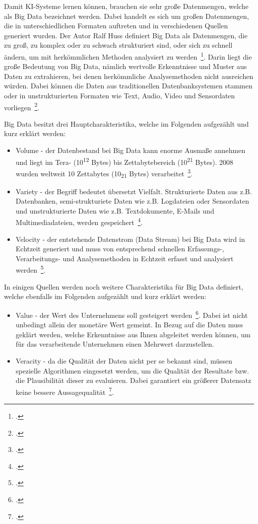 Damit {KI}-Systeme lernen können, brauchen sie sehr große Datenmengen, welche als Big Data bezeichnet werden. Dabei handelt es sich um großen Datenmengen, die in unterschiedlichen Formaten auftreten
und in verschiedenen Quellen generiert wurden. Der Autor Ralf Huss definiert Big Data als Datenmengen, die zu groß, zu komplex oder zu schwach strukturiert sind, oder sich zu schnell ändern, um mit herkömmlichen
Methoden analysiert zu werden~\footcite[][]{Huss.2019}. Darin liegt die große Bedeutung von Big Data, nämlich wertvolle Erkenntnisse und Muster aus Daten zu extrahieren,
bei denen herkömmliche Analysemethoden nicht ausreichen würden. Dabei können die Daten aus traditionellen Datenbanksystemen stammen oder in unstrukturierten Formaten wie Text, Audio, Video und Sensordaten vorliegen~\footcite[\vglf][]{Fasel.2019}.

Big Data besitzt drei Hauptcharakteristika, welche im Folgenden aufgezählt und kurz erklärt werden:

\begin{itemize}
    \item Volume - der Datenbestand bei Big Data kann enorme Ausmaße annehmen und liegt im Tera- (10\textsuperscript{12} Bytes) bis Zettabytebereich (10\textsuperscript{21} Bytes). 2008 wurden weltweit 10 Zettabytes (10\textsubscript{21} Bytes) verarbeitet~\footcite[\vglf][]{Huss.2019}. 
    \item Variety - der Begriff bedeutet übersetzt Vielfalt. Strukturierte Daten aus z.B. Datenbanken, semi-strukturiete Daten wie z.B. Logdateien oder Sensordaten und unstrukturierte Daten wie z.B. Textdokumente, E-Mails und Multimediadateien, werden gespeichert~\footcite[\vglf][]{Fasel.2019}.
    \item Velocity - der entstehende Datenstrom (Data Stream) bei Big Data wird in Echtzeit generiert und muss von entsprechend schnellen Erfassungs-, Verarbeitungs- und Analysemethoden in Echtzeit erfasst und analysiert werden~\footcite[\vglf][]{Fasel.2019}.
\end{itemize}


In einigen Quellen werden noch weitere Charakteristika für Big Data definiert, welche ebenfalls im Folgenden aufgezählt und kurz erklärt werden: 

\begin{itemize}
    \item Value - der Wert des Unternehmens soll gesteigert werden~\footcite[\vglf][]{Fasel.2019}. Dabei ist nicht unbedingt allein der monetäre Wert gemeint. In Bezug auf die Daten muss geklärt werden,
    welche Erkenntnisse aus Ihnen abgeleitet werden können, um für das verarbeitende Unternehmen einen Mehrwert darzustellen. 
    \item Veracity - da die Qualität der Daten nicht per se bekannt sind, müssen spezielle Algorithmen eingesetzt werden, um die Qualität der Resultate bzw. die Plausibilität dieser zu evaluieren. Dabei garantiert
 ein größerer Datensatz keine bessere Aussagequalität~\footcite[\vglf][]{Fasel.2019}.
\end{itemize}

